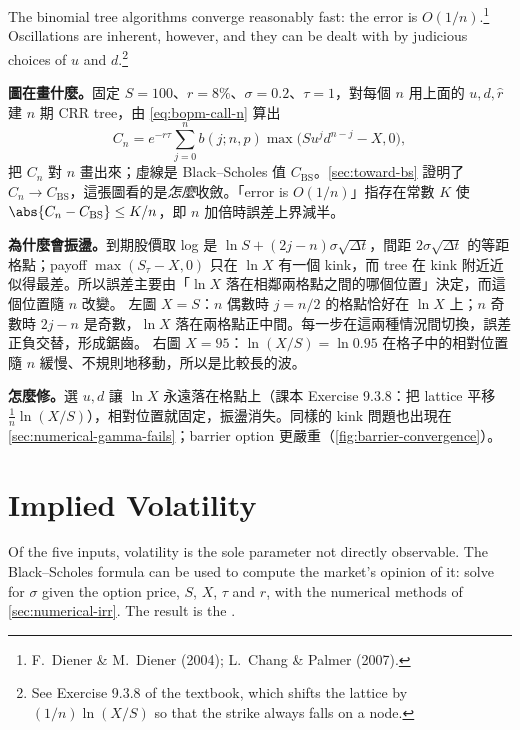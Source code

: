 The binomial tree algorithms converge reasonably fast: the error is $O(1/n)$.\footnote{F.~Diener \& M.~Diener (2004); L.~Chang \& Palmer (2007).}
Oscillations are inherent, however, and they can be dealt with by judicious choices of $u$ and $d$.\footnote{See Exercise 9.3.8 of the textbook, which shifts the lattice by $(1/n)\ln(X/S)$ so that the strike always falls on a node.}

\suppstart
\begin{remark}
	\textbf{圖在畫什麼。}固定 $S=100$、$r=8\%$、$\sigma=0.2$、$\tau=1$，對每個 $n$ 用上面的 $u,d,\hat{r}$ 建 $n$ 期 CRR tree，由 \eqref{eq:bopm-call-n} 算出
	\[
		C_{n}=e^{-r\tau}\sum_{j=0}^{n}b(j;n,p)\max\bigl(Su^{j}d^{n-j}-X,0\bigr) ,
	\]
	把 $C_{n}$ 對 $n$ 畫出來；虛線是 Black--Scholes 值 $C_{\mathrm{BS}}$。\autoref{sec:toward-bs} 證明了 $C_{n}\to C_{\mathrm{BS}}$，這張圖看的是\emph{怎麼}收斂。「error is $O(1/n)$」指存在常數 $K$ 使 $\abs{C_{n}-C_{\mathrm{BS}}}\le K/n$，即 $n$ 加倍時誤差上界減半。

	\textbf{為什麼會振盪。}到期股價取 log 是 $\ln S+(2j-n)\sigma\sqrt{\Delta t}$，間距 $2\sigma\sqrt{\Delta t}$ 的等距格點；payoff $\max(S_{\tau}-X,0)$ 只在 $\ln X$ 有一個 kink，而 tree 在 kink 附近近似得最差。所以誤差主要由「$\ln X$ 落在相鄰兩格點之間的哪個位置」決定，而這個位置隨 $n$ 改變。
	左圖 $X=S$：$n$ 偶數時 $j=n/2$ 的格點恰好在 $\ln X$ 上；$n$ 奇數時 $2j-n$ 是奇數，$\ln X$ 落在兩格點正中間。每一步在這兩種情況間切換，誤差正負交替，形成鋸齒。
	右圖 $X=95$：$\ln(X/S)=\ln0.95$ 在格子中的相對位置隨 $n$ 緩慢、不規則地移動，所以是比較長的波。

	\textbf{怎麼修。}選 $u,d$ 讓 $\ln X$ 永遠落在格點上（課本 Exercise 9.3.8：把 lattice 平移 $\frac1n\ln(X/S)$），相對位置就固定，振盪消失。同樣的 kink 問題也出現在 \autoref{sec:numerical-gamma-fails}；barrier option 更嚴重（\autoref{fig:barrier-convergence}）。
\end{remark}
\suppend

\section{Implied Volatility}
\label{sec:implied-vol}


Of the five inputs, volatility is the sole parameter not directly observable.
The Black--Scholes formula can be used to compute the market's opinion of it: solve for $\sigma$ given the option price, $S$, $X$, $\tau$ and $r$, with the numerical methods of \autoref{sec:numerical-irr}.
The result is the .


